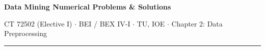\documentclass[10pt]{article}
\begin{document}
{\LARGE\bfseries Data Mining \gap\textcolor{sub}{Numerical Problems \& Solutions}}\par
{\footnotesize\color{sub} CT 72502 (Elective I) $\cdot$ BEI / BEX IV-I $\cdot$ TU, IOE
$\cdot$ Chapter 2: Data Preprocessing}
\vspace{3pt}\hrule\vspace{4pt}




\end{document}
